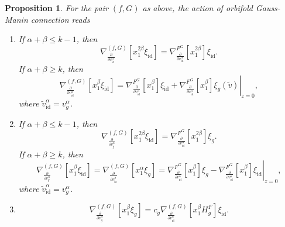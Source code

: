 \documentclass[reqno,12pt]{amsart}
\numberwithin{equation}{section}
\theoremstyle{plain}
\newtheorem{proposition}[theorem]{Proposition}
\theoremstyle{definition}
\newcommand{\id}{\mathrm{id}}
\numberwithin{equation}{section}
\begin{document}
\begin{proposition}\label{EF1}
    For the pair $(f,G)$ as above, the action of orbifold Gauss-Manin connection reads
\begin{enumerate}
\item 
If $\alpha+\beta \le k-1$, then
\[
\nabla_{\frac{\partial}{\partial v^\alpha_{\id}}}^{(f,G)}[x_1^{2\beta}\xi_{\id}] = \nabla^{F^G}_{\frac{\partial}{\partial v^\alpha_{\id}}}[x_1^{2\beta}]\xi_{\id}.
\]
If $\alpha+\beta \ge k$, then
\[
\nabla_{\frac{\partial}{\partial v^\alpha_{\id}}}^{(f,G)}[x_1^{\beta}\xi_{\id}] = \nabla^{F^G}_{\frac{\partial}{\partial v^\alpha_{\id}}}[x_1^{\beta}]\xi_{\id} + \left.\nabla^{F^G}_{\frac{\partial}{\partial v^\alpha_{\id}}}[x_1^{\beta}]\xi_{g}(\widetilde v)\right\vert_{z=0},
\]
where $\widetilde v^{\alpha}_\id = v_g^{\alpha}$.
\item 
If $\alpha+\beta \le k-1$, then
\[
\nabla_{\frac{\partial}{\partial v^\alpha_{g}}}^{(f,G)}[x_1^{2\beta}\xi_{\id}] = \nabla^{F^G}_{\frac{\partial}{\partial v^\alpha_{\id}}}[x_1^{2\beta}]\xi_{g}.
\]
If $\alpha+\beta \ge k$, then
\[
\nabla_{\frac{\partial}{\partial v^\alpha_{g}}}^{(f,G)}[x_1^{\beta}\xi_{\id}] = \nabla_{\frac{\partial}{\partial v^\beta_{\id}}}^{(f,G)}[x_1^{\alpha}\xi_{g}]  = \nabla^{F^G}_{\frac{\partial}{\partial v^\alpha_{\id}}}[x_1^{\beta}]\xi_{g} - \left.\nabla^{F^G}_{\frac{\partial}{\partial v^\alpha_{\id}}}[x_1^{\beta}]\xi_{\id}\right\vert_{ z=0},
\]
where $\widetilde v^{\alpha}_\id = v_g^{\alpha}$.

\item \[
\nabla_{\frac{\partial}{\partial v^\alpha_{g}}}^{(f,G)}[x_1^\beta\xi_{g}] =  c_g\nabla_{\frac{\partial}{\partial v^\alpha_{\id}}}^{(f,G)}[x_1^\beta  H_g^F]\xi_{\id}.
\]
\end{enumerate}
\end{proposition}
\end{document}
